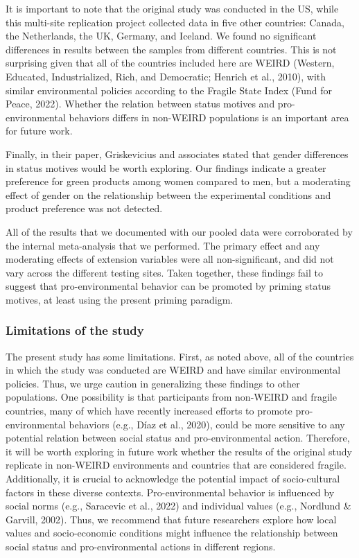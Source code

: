 \documentclass[
]{article}
\begin{document}
It is important to note that the original study was conducted in the US,
while this multi-site replication project collected data in five other
countries: Canada, the Netherlands, the UK, Germany, and Iceland. We
found no significant differences in results between the samples from
different countries. This is not surprising given that all of the
countries included here are WEIRD (Western, Educated, Industrialized,
Rich, and Democratic; Henrich et al., 2010), with similar environmental
policies according to the Fragile State Index (Fund for Peace, 2022).
Whether the relation between status motives and pro-environmental
behaviors differs in non-WEIRD populations is an important area for
future work.

Finally, in their paper, Griskevicius and associates stated that gender
differences in status motives would be worth exploring. Our findings
indicate a greater preference for green products among women compared to
men, but a moderating effect of gender on the relationship between the
experimental conditions and product preference was not detected.

All of the results that we documented with our pooled data were
corroborated by the internal meta-analysis that we performed. The
primary effect and any moderating effects of extension variables were
all non-significant, and did not vary across the different testing
sites. Taken together, these findings fail to suggest that
pro-environmental behavior can be promoted by priming status motives, at
least using the present priming paradigm.

\subsubsection{Limitations of the study}\label{limitations-of-the-study}

The present study has some limitations. First, as noted above, all of
the countries in which the study was conducted are WEIRD and have
similar environmental policies. Thus, we urge caution in generalizing
these findings to other populations. One possibility is that
participants from non-WEIRD and fragile countries, many of which have
recently increased efforts to promote pro-environmental behaviors (e.g.,
Díaz et al., 2020), could be more sensitive to any potential relation
between social status and pro-environmental action. Therefore, it will
be worth exploring in future work whether the results of the original
study replicate in non-WEIRD environments and countries that are
considered fragile. Additionally, it is crucial to acknowledge the
potential impact of socio-cultural factors in these diverse contexts.
Pro-environmental behavior is influenced by social norms (e.g.,
Saracevic et al., 2022) and individual values (e.g., Nordlund \&
Garvill, 2002). Thus, we recommend that future researchers explore how
local values and socio-economic conditions might influence the
relationship between social status and pro-environmental actions in
different regions.
\end{document}
